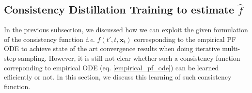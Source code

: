 \documentclass[11pt]{article}
\newcommand{\xh}[1]{\textcolor[HTML]{66CCFF}{#1}}
\def\rvx{{\mathbf{x}}}
\begin{document}


\subsection{Consistency Distillation Training to estimate $\hat{f}$}
\label{learning_subsec}

\noindent
In the previous subsection, we discussed how we can exploit the given formulation of the consistency function \textit{i.e.} $\hat{f}(t',t,\rvx_t)$ corresponding to the empirical PF ODE to achieve state of the art convergence results when doing iterative multi-step sampling. However, it is still not clear whether such a consistency function correponding to empirical ODE (eq. \ref{empirical_pf_ode}) can be learned efficiently or not. In this section, we discuss this learning of such consistency function. \\
\end{document}
